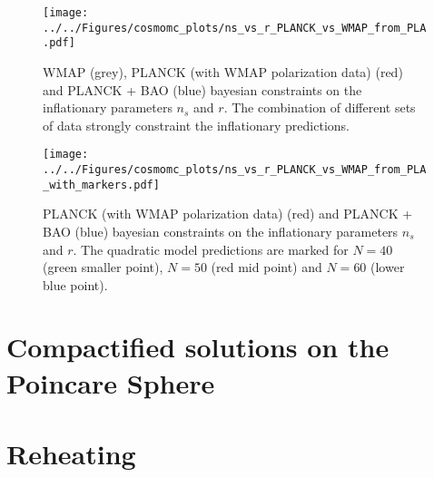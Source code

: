 \documentclass[12pt,letterpaper,twoside]{book}
\newcommand\etcomment[1]{\MakeUppercase{\mytexttt{\textcolor{blue}{#1}}}}
\begin{document}
\begin{figure}[ht]
    \begin{center}
        \texttt{[image: ../../Figures/cosmomc\_plots/ns\_vs\_r\_PLANCK\_vs\_WMAP\_from\_PLA.pdf]}
        \caption{\etcomment{Include this here?} WMAP (grey), PLANCK (with WMAP polarization data) (red) and
                 PLANCK + BAO (blue) bayesian constraints on the
                 inflationary parameters $n_s$ and $r$. The combination of
                 different sets of data strongly constraint the inflationary
                 predictions.}
        \label{fig:ns_vs_r_1}
    \end{center}
\end{figure}

\begin{figure}[ht]
    \begin{center}
    \texttt{[image: ../../Figures/cosmomc\_plots/ns\_vs\_r\_PLANCK\_vs\_WMAP\_from\_PLA\_with\_markers.pdf]}
    \caption{PLANCK (with WMAP polarization data) (red) and PLANCK + BAO (blue)
             bayesian constraints on the inflationary parameters $n_s$ and $r$.
             The quadratic model predictions are marked for $N=40$ (green smaller
             point), $N=50$ (red mid point) and $N=60$ (lower blue point).}
    \label{fig:ns_vs_r_2}
    \end{center}
\end{figure}








\section{Compactified solutions on the Poincare Sphere}





%
\section{Reheating}
\end{document}
